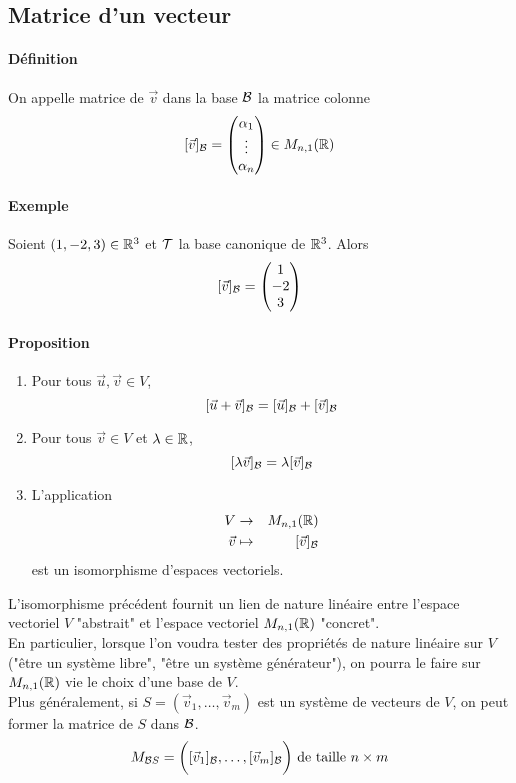 %
\subsection{Matrice d'un vecteur}
%
\paragraph{Définition} On appelle  matrice de $\vec{v}$ dans la base $\mathcal{B}$ la matrice colonne 
$$[\vec{v}]_{\mathcal{B}} = 
\begin{pmatrix} 
  \alpha_1 \\ 
  \vdots \\ 
  \alpha_n 
\end{pmatrix} 
\in M_{n, 1}(\mathbb{R})$$

\paragraph{Exemple} Soient $(1, -2, 3) \in \mathbb{R}^3$ et $\mathcal{T}$ la base canonique de $\mathbb{R}^3$. Alors
$$[\vec{v}]_{\mathcal{B}} = 
\begin{pmatrix} 
  1 \\ 
  -2 \\ 
  3 
\end{pmatrix}$$

\paragraph{Proposition} 
\begin{enumerate}
  \item Pour tous $\vec{u}, \vec{v} \in V$, 
    $$[\vec{u} + \vec{v}]_{\mathcal{B}} = [\vec{u}]_{\mathcal{B}} + [\vec{v}]_{\mathcal{B}}$$
  \item Pour tous $\vec{v} \in V$ et $\lambda  \in \mathbb{R}$, 
    $$[\lambda \vec{v}]_{\mathcal{B}} = \lambda [\vec{v}]_{\mathcal{B}}$$
  \item L'application
    \begin{eqnarray*}
      V &\rightarrow& M_{n, 1}(\mathbb{R}) \\
      \vec{v} &\mapsto& [\vec{v}]_{\mathcal{B}}
    \end{eqnarray*}
    est un isomorphisme d'espaces vectoriels.
\end{enumerate}
L'isomorphisme précédent fournit un lien de nature linéaire entre l'espace vectoriel $V$ "abstrait" et l'espace vectoriel $M_{n, 1}(\mathbb{R})$ "concret". \\
En particulier, lorsque l'on voudra tester des propriétés de nature linéaire sur $V$ ("être un système libre", "être un système générateur"), on pourra le faire sur $M_{n, 1}(\mathbb{R})$ vie le choix d'une base de $V$. \\
Plus généralement, si $S=(\vec{v}_1, \ldots, \vec{v}_m)$ est un système de vecteurs de $V$, on peut former la matrice de $S$ dans $\mathcal{B}$.
$$M_{\mathcal{B} S} = \bigg( [\vec{v}_1]_{\mathcal{B}}, \ldots, [\vec{v}_m]_{\mathcal{B}} \bigg) \text{ de taille } n \times m$$

